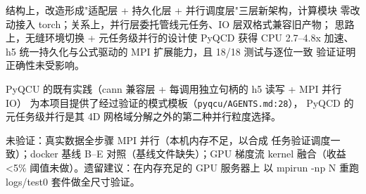 \documentclass[UTF8]{ctexart}
\begin{document}
\begin{conclbox}
结构上，改造形成"适配层 + 持久化层 + 并行调度层"三层新架构，计算模块
零改动接入 torch；关系上，并行层委托管线元任务、IO 层双格式兼容旧产物；
思路上，无缝环境切换 + 元任务级并行的设计使 PyQCD 获得 CPU 2.7--4.8x
加速、h5 统一持久化与公式驱动的 MPI 扩展能力，且 18/18 测试与逐位一致
验证证明正确性未受影响。
\end{conclbox}

\begin{refbox}
PyQCU 的既有实践（cann 兼容层 + 每调用独立句柄的 h5 读写 + MPI 并行 IO）
为本项目提供了经过验证的模式模板（\texttt{\nolinkurl{pyqcu/AGENTS.md:28}}），
PyQCD 的元任务级并行是其 4D 网格域分解之外的第二种并行粒度选择。
\end{refbox}

\begin{warnbox}
\textcolor{warn}{未验证}：真实数据全步骤 MPI 并行（本机内存不足，以合成
任务验证调度一致）；docker 基线 B--E 对照（基线文件缺失）；GPU 梯度流
kernel 融合（收益 <5\% 阈值未做）。遗留建议：在内存充足的 GPU 服务器上
以 mpirun -np N 重跑 logs/test0 套件做全尺寸验证。
\end{warnbox}
\end{document}
